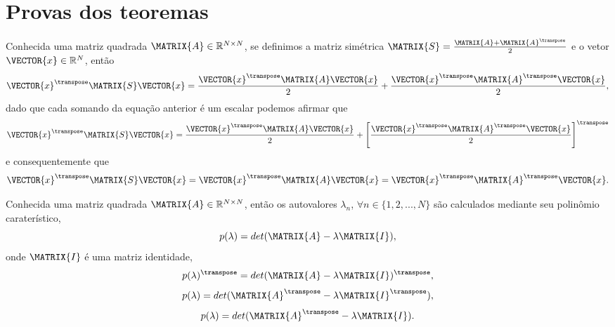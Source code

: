 \section{Provas dos teoremas}

\begin{myproofT}\label{proof:theo:simetricmatrix0}
Conhecida uma matriz quadrada $\MATRIX{A} \in \mathbb{R}^{N \times N}$,
se definimos a matriz simétrica $\MATRIX{S}=\frac{\MATRIX{A}+\MATRIX{A}^{\transpose}}{2}$ e
o vetor $\VECTOR{x} \in \mathbb{R}^{N}$, então
\begin{equation}
\VECTOR{x}^{\transpose}\MATRIX{S}\VECTOR{x} = 
\frac{\VECTOR{x}^{\transpose}\MATRIX{A}\VECTOR{x}}{2} +
\frac{\VECTOR{x}^{\transpose}\MATRIX{A}^{\transpose}\VECTOR{x}}{2},
\end{equation}
dado que cada somando da equação anterior é um escalar podemos afirmar que 
\begin{equation}
\VECTOR{x}^{\transpose}\MATRIX{S}\VECTOR{x} = 
\frac{\VECTOR{x}^{\transpose}\MATRIX{A}\VECTOR{x}}{2} +
\left[\frac{\VECTOR{x}^{\transpose}\MATRIX{A}^{\transpose}\VECTOR{x}}{2}\right]^{\transpose}
\end{equation}
e consequentemente que
\begin{equation}
\VECTOR{x}^{\transpose}\MATRIX{S}\VECTOR{x} = 
\VECTOR{x}^{\transpose}\MATRIX{A}\VECTOR{x} =
\VECTOR{x}^{\transpose}\MATRIX{A}^{\transpose}\VECTOR{x}.
\end{equation} 
\end{myproofT}

\begin{myproofT}\label{proof:theo:matrixgeneric3}
Conhecida uma matriz quadrada $\MATRIX{A} \in \mathbb{R}^{N \times N}$, 
então os  autovalores $\lambda_n$, $\forall n \in \{1, 2, ..., N\}$ são calculados mediante 
seu polinômio caraterístico,
\begin{equation}
p(\lambda)=det(\MATRIX{A}-\lambda \MATRIX{I}),
\end{equation}
onde $\MATRIX{I}$ é uma matriz identidade,
\begin{equation}
p(\lambda)^{\transpose}=det(\MATRIX{A}-\lambda \MATRIX{I})^{\transpose},
\end{equation}
\begin{equation}
p(\lambda)=det(\MATRIX{A}^{\transpose}-\lambda \MATRIX{I}^{\transpose}),
\end{equation}
\begin{equation}
p(\lambda)=det(\MATRIX{A}^{\transpose}-\lambda \MATRIX{I}).
\end{equation}
\end{myproofT}

